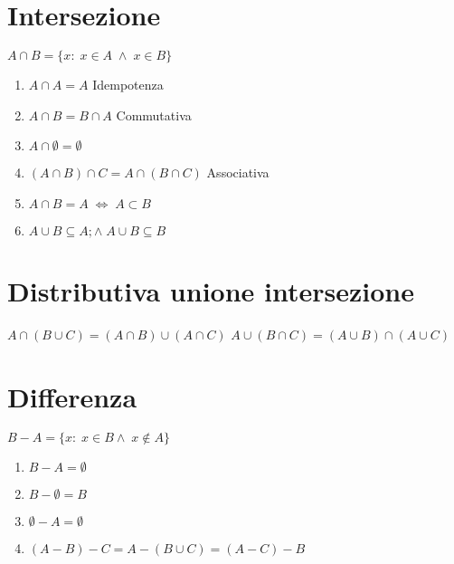 \section{Intersezione}
\begin{center}
	
\end{center}
$A\cap B=\lbrace x:\;x\in A\;\wedge\; x\in B\rbrace$
\begin{enumerate}
	\item $A\cap A=A$ Idempotenza
	\item $A\cap B=B\cap A$ Commutativa
	\item $A\cap\emptyset=\emptyset$
	\item $\left(A\cap B\right)\cap C=A\cap\left(B\cap C\right)$ Associativa
	\item $A\cap B=A\;\Leftrightarrow\; A\subset B$
	\item $A\cup B\subseteq A;\wedge\;A\cup B\subseteq B$ 
\end{enumerate}
\section{Distributiva unione intersezione}
$A\cap\left(B\cup C\right)=\left(A\cap B\right)\cup\left(A\cap C\right)$
$A\cup\left(B\cap C\right)=\left(A\cup B\right)\cap\left(A\cup C\right)$
\section{Differenza}
\begin{center}
	
\end{center}
$B-A=\lbrace x:\; x\in B\wedge\; x\notin A\rbrace$
\begin{enumerate}
	\item $B-A=\emptyset$
	\item $B-\emptyset=B$
	\item $\emptyset-A=\emptyset$
	\item $\left(A-B\right)-C=A-\left(B\cup C\right)=\left(A-C\right)-B$
\end{enumerate}
